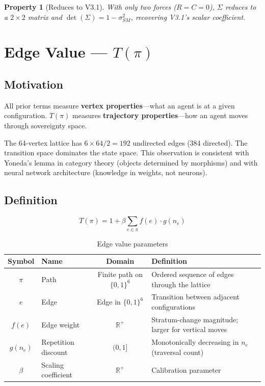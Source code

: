 \documentclass[11pt,a4paper]{article}
\newtheorem{property}{Property}[section]
\begin{document}
\begin{property}[Reduces to V3.1]
With only two forces ($R = C = 0$), $\Sigma$ reduces to a $2 \times 2$ matrix and $\det(\Sigma) = 1 - \sigma_{SM}^2$, recovering V3.1's scalar coefficient.
\end{property}

\section{Edge Value --- \texorpdfstring{$T(\pi)$}{T(pi)}}
\label{sec:edge}

\subsection{Motivation}

All prior terms measure \textbf{vertex properties}---what an agent is at a given configuration. $T(\pi)$ measures \textbf{trajectory properties}---how an agent moves through sovereignty space.

The 64-vertex lattice has $6 \times 64 / 2 = 192$ undirected edges (384 directed). The transition space dominates the state space. This observation is consistent with Yoneda's lemma in category theory (objects determined by morphisms) and with neural network architecture (knowledge in weights, not neurons).

\subsection{Definition}

\begin{equation}\label{eq:edge}
T(\pi) = 1 + \beta \sum_{e \in \pi} f(e) \cdot g(n_e)
\end{equation}

\begin{table}[h]
\centering
\caption{Edge value parameters}
\begin{tabular}{@{}clcL{6.5cm}@{}}
\toprule
\textbf{Symbol} & \textbf{Name} & \textbf{Domain} & \textbf{Definition} \\
\midrule
$\pi$ & Path & Finite path on $\{0,1\}^6$ & Ordered sequence of edges through the lattice \\
$e$ & Edge & Edge in $\{0,1\}^6$ & Transition between adjacent configurations \\
$f(e)$ & Edge weight & $\mathbb{R}^+$ & Stratum-change magnitude; larger for vertical moves \\
$g(n_e)$ & Repetition discount & $(0,1]$ & Monotonically decreasing in $n_e$ (traversal count) \\
$\beta$ & Scaling coefficient & $\mathbb{R}^+$ & Calibration parameter \\
\bottomrule
\end{tabular}
\end{table}
\end{document}
